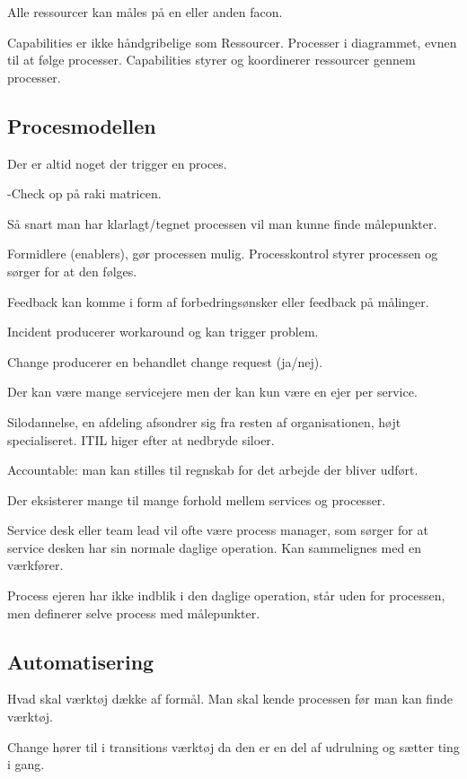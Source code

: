 Alle ressourcer kan måles på en eller anden facon.

Capabilities er ikke håndgribelige som Ressourcer. Processer i diagrammet, evnen til at følge processer. Capabilities styrer og koordinerer ressourcer gennem processer.

\subsection{Procesmodellen}
Der er altid noget der trigger en proces.

-Check op på raki matricen.

Så snart man har klarlagt/tegnet processen vil man kunne finde målepunkter.

Formidlere (enablers), gør processen mulig. Processkontrol styrer processen og sørger for at den følges.

Feedback kan komme i form af forbedringsønsker eller feedback på målinger.

Incident producerer workaround og kan trigger problem.

Change producerer en behandlet change request (ja/nej).

Der kan være mange servicejere men der kan kun være en ejer per service.

Silodannelse, en afdeling afsondrer sig fra resten af organisationen, højt specialiseret. ITIL higer efter at nedbryde siloer.

Accountable: man kan stilles til regnskab for det arbejde der bliver udført.

Der eksisterer mange til mange forhold mellem services og processer.

Service desk eller team lead vil ofte være process manager, som sørger for at service desken har sin normale daglige operation. Kan sammelignes med en værkfører.

Process ejeren har ikke indblik i den daglige operation, står uden for processen, men definerer selve process med målepunkter.

\subsection{Automatisering}
Hvad skal værktøj dække af formål. Man skal kende processen før man kan finde værktøj. 

Change hører til i transitions værktøj da den er en del af udrulning og sætter ting i gang.






%
%


